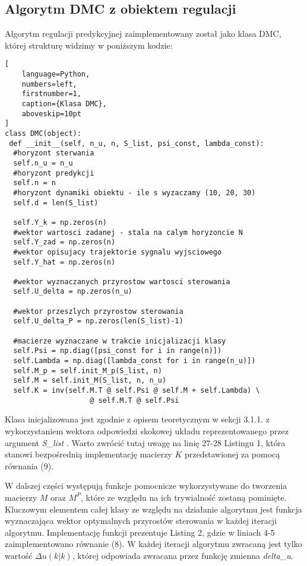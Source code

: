 \subsection{Algorytm DMC z obiektem regulacji}
Algorytm regulacji predykcyjnej zaimplementowany został jako klasa DMC, której strukturę widzimy w poniższym kodzie: 
\begin{addmargin}[10mm]{0mm}
\begin{lstlisting}[
    language=Python,
    numbers=left,
    firstnumber=1,
    caption={Klasa DMC},
    aboveskip=10pt  
]
class DMC(object):
 def __init__(self, n_u, n, S_list, psi_const, lambda_const):		
  #horyzont sterwania 
  self.n_u = n_u
  #horyzont predykcji
  self.n = n 
  #horyzont dynamiki obiektu - ile s wyzaczamy (10, 20, 30)
  self.d = len(S_list)

  self.Y_k = np.zeros(n)
  #wektor wartosci zadanej - stala na calym horyzoncie N
  self.Y_zad = np.zeros(n)
  #wektor opisujacy trajektorie sygnalu wyjsciowego 
  self.Y_hat = np.zeros(n)

  #wektor wyznaczanych przyrostow wartosci sterowania 
  self.U_delta = np.zeros(n_u)

  #wektor przeszlych przyrostow sterowania
  self.U_delta_P = np.zeros(len(S_list)-1)
		
  #macierze wyznaczane w trakcie inicjalizacji klasy
  self.Psi = np.diag([psi_const for i in range(n)])
  self.Lambda = np.diag([lambda_const for i in range(n_u)])
  self.M_p = self.init_M_p(S_list, n)
  self.M = self.init_M(S_list, n, n_u)
  self.K = inv(self.M.T @ self.Psi @ self.M + self.Lambda) \ 
					@ self.M.T @ self.Psi
\end{lstlisting}
\end{addmargin}

Klasa inicjalizowana jest zgodnie z opisem teoretycznym w sekcji 3.1.1. z wykorzystaniem wektora odpowiedzi skokowej układu reprezentowanego przez argument \emph{ S{\_}list }. Warto zwrócić tutaj uwagę na linię 27-28 Listingu 1, która stanowi bezpośrednią implementację macierzy \(K\) przedstawionej za pomocą równania (9).
\par W dalszej części występują funkcje pomocnicze wykorzystywane do tworzenia macierzy \(M\) oraz \(M^P\), które ze względu na ich trywialność zostaną pominięte. Kluczowym elementem całej klasy ze względu na działanie algorytmu jest funkcja wyznaczająca wektor optymalnych przyrostów sterowania w każdej iteracji algorytmu. Implementację funkcji prezentuje Listing 2, gdzie w liniach 4-5 zaimplementowano równanie (8). W każdej iteracji algorytmu zwracaną jest tylko wartość \(\Delta u(k|k) \), której odpowiada zwracana przez funkcję zmienna \emph{delta{\_}u}.

